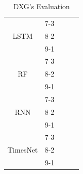 \documentclass{ieeeojies}
\begin{document}
\begin{table}[H]
\begin{tabular}{|ccccc|}
  \multicolumn{1}{|c|}{\multirow{3}{*}{LSTM}}              & \multicolumn{1}{c|}{7-3}            & \multicolumn{1}{c|}{}  & \multicolumn{1}{c|}{}      &  \\ \cline{2-5} 
  \multicolumn{1}{|c|}{}                                   & \multicolumn{1}{c|}{8-2}        & \multicolumn{1}{c|}{}  & \multicolumn{1}{c|}{}      &  \\ \cline{2-5} 
  \multicolumn{1}{|c|}{}                                   & \multicolumn{1}{c|}{9-1}        & \multicolumn{1}{c|}{}  & \multicolumn{1}{c|}{}      &  \\ \hline
  \multicolumn{1}{|c|}{\multirow{3}{*}{RF}}                & \multicolumn{1}{c|}{7-3}            & \multicolumn{1}{c|}{}        & \multicolumn{1}{c|}{}          &       \\ \cline{2-5} 
  \multicolumn{1}{|c|}{}                                   & \multicolumn{1}{c|}{8-2}        & \multicolumn{1}{c|}{}        & \multicolumn{1}{c|}{}          &       \\ \cline{2-5} 
  \multicolumn{1}{|c|}{}                                   & \multicolumn{1}{c|}{9-1}        & \multicolumn{1}{c|}{}        & \multicolumn{1}{c|}{}          &       \\ \hline
  \multicolumn{1}{|c|}{\multirow{3}{*}{RNN}}               & \multicolumn{1}{c|}{7-3}            & \multicolumn{1}{c|}{}        & \multicolumn{1}{c|}{}          &       \\ \cline{2-5} 
  \multicolumn{1}{|c|}{}                                   & \multicolumn{1}{c|}{8-2}        & \multicolumn{1}{c|}{}        & \multicolumn{1}{c|}{}          &       \\ \cline{2-5} 
  \multicolumn{1}{|c|}{}                                   & \multicolumn{1}{c|}{9-1}        & \multicolumn{1}{c|}{}        & \multicolumn{1}{c|}{}          &       \\ \hline
  \multicolumn{1}{|c|}{\multirow{3}{*}{TimesNet}}          & \multicolumn{1}{c|}{7-3}            & \multicolumn{1}{c|}{} & \multicolumn{1}{c|}{}     &  \\ \cline{2-5} 
  \multicolumn{1}{|c|}{}                                   & \multicolumn{1}{c|}{8-2}        & \multicolumn{1}{c|}{} & \multicolumn{1}{c|}{}     &  \\ \cline{2-5} 
  \multicolumn{1}{|c|}{}                                   & \multicolumn{1}{c|}{9-1}        & \multicolumn{1}{c|}{} & \multicolumn{1}{c|}{}     &  \\ \hline
  \end{tabular}
  \caption{DXG's Evaluation}
    \label{vcbresult}
  \end{table}
\end{document}
